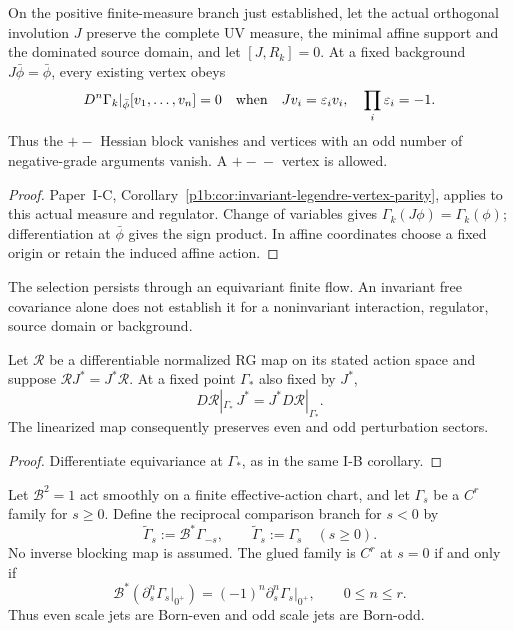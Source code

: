 \documentclass[12pt,a4paper]{article}
\begin{document}
\begin{corollary}
\label{p12:cor:born-vertex-selection}
On the positive finite-measure branch just established, let the actual
orthogonal involution \(J\) preserve the complete UV measure, the
minimal affine support and the dominated source domain, and let
\([J,R_k]=0\). At a fixed background \(J\bar\phi=\bar\phi\), every
existing vertex obeys
\[
 D^n\Gamma_k|_{\bar\phi}[v_1,\ldots,v_n]=0
 \quad\hbox{when}\quad Jv_i=\varepsilon_i v_i,\quad
 \prod_i\varepsilon_i=-1 .
\]
Thus the \(+\!-\) Hessian block vanishes and vertices with an odd
number of negative-grade arguments vanish. A \(+\!-\!-\) vertex
is allowed.
\end{corollary}
\begin{proof}
Paper~I-C, Corollary~\ref{p1b:cor:invariant-legendre-vertex-parity},
applies to this actual measure and regulator. Change of variables gives
\(\Gamma_k(J\phi)=\Gamma_k(\phi)\); differentiation at \(\bar\phi\)
gives the sign product. In affine coordinates choose a fixed origin or
retain the induced affine action.
\end{proof}
The selection persists through an equivariant finite flow. An invariant
free covariance alone does not establish it for a noninvariant interaction,
regulator, source domain or background.

\begin{corollary}
\label{p12:cor:born-rg-stability-blocks}
Let \(\mathcal R\) be a differentiable normalized RG map on its stated
action space and suppose \(\mathcal R J^*=J^*\mathcal R\).
At a fixed point \(\Gamma_*\) also fixed by \(J^*\),
\[
 D\mathcal R|_{\Gamma_*}\,J^*
   =J^*D\mathcal R|_{\Gamma_*}.
\]
The linearized map consequently preserves even and odd perturbation sectors.
\end{corollary}
\begin{proof}
Differentiate equivariance at \(\Gamma_*\), as in the same I-B corollary.
\end{proof}

\begin{theorem}
\label{p12:thm:born-reflected-family-jet-parity}
Let $\mathcal B^2=1$ act smoothly on a finite effective-action chart, and let
$\Gamma_s$ be a $C^r$ family for $s\ge0$.  Define the reciprocal comparison
branch for $s<0$ by
\[
 \widetilde\Gamma_s:=\mathcal B^*\Gamma_{-s},
 \qquad
 \widetilde\Gamma_s:=\Gamma_s\quad(s\ge0).
\]
No inverse blocking map is assumed.  The glued family is $C^r$ at $s=0$ if
and only if
\[
 \boxed{
 \mathcal B^*\left(\partial_s^n\Gamma_s\big|_{0^+}\right)
 =(-1)^n\partial_s^n\Gamma_s\big|_{0^+},
 \qquad 0\le n\le r.}
\]
Thus even scale jets are Born-even and odd scale jets are Born-odd.
\end{theorem}
\end{document}
